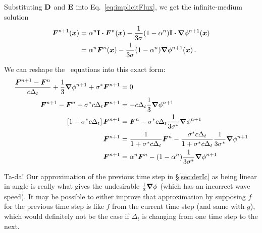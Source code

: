 Substituting $\mathbf{D}$ and $\mathbf{E}$ into Eq.~\eqref{eq:implicitFlux}, we get the
infinite-medium solution
\begin{align*}
  \bm{F}^{n+1}(\bm{x})
  &= \alpha^n \mathbf{I} \bm{\cdot} \bm{F}^n(\bm{x})
  - \frac{1}{3 \sigma} ( 1 - \alpha^n) \mathbf{I} \bm{\cdot} \bm{\nabla} \phi^{n+1} (\bm{x}) 
  \\
  &= \alpha^n \bm{F}^n(\bm{x})
  - \frac{1}{3 \sigma} ( 1 - \alpha^n) \bm{\nabla} \phi^{n+1} (\bm{x})\,.
\end{align*}

We can reshape the \Pone\ equations into this exact form:
\begin{align*}
  \frac{\bm{F}^{n+1} - \bm{F}^n}{c \Delta_t} + \frac{1}{3} \bm{\nabla} \phi^{n+1}
  + \sigma^\ast \bm{F}^{n+1} &= 0
  \\
  \bm{F}^{n+1} - \bm{F}^n 
  + \sigma^\ast c \Delta_t \bm{F}^{n+1}
  &= - c \Delta_t \frac{1}{3} \bm{\nabla} \phi^{n+1}
  \\
  \left[ 1 + \sigma^\ast c \Delta_t \right] \bm{F}^{n+1}
  &= \bm{F}^n - \sigma^\ast c \Delta_t \frac{1}{3\sigma^\ast} \bm{\nabla} \phi^{n+1}
  \\
  \bm{F}^{n+1}
  &= \frac{1}{1 + \sigma^\ast c \Delta_t} \bm{F}^n - \frac{\sigma^\ast c
  \Delta_t}{1 + \sigma^\ast c \Delta_t} \frac{1}{3\sigma^\ast} \bm{\nabla} \phi^{n+1}
  \\
  \bm{F}^{n+1}
  &= \alpha^n \bm{F}^n - (1 - \alpha^n) \frac{1}{3\sigma^\ast} \bm{\nabla} \phi^{n+1}
\end{align*}

Ta-da! Our approximation of the previous time step in \S\ref{sec:derIc} as
being linear in angle is really what gives the undesirable $\frac13\bm{\nabla}\phi$
(which has an incorrect wave speed). It may be possible to either improve that
approximation by supposing $f$ for the previous time step is like $f$ from the
current time step (and same with $g$), which would definitely not be the case
if $\Delta_t$ is changing from one time step to the next.

